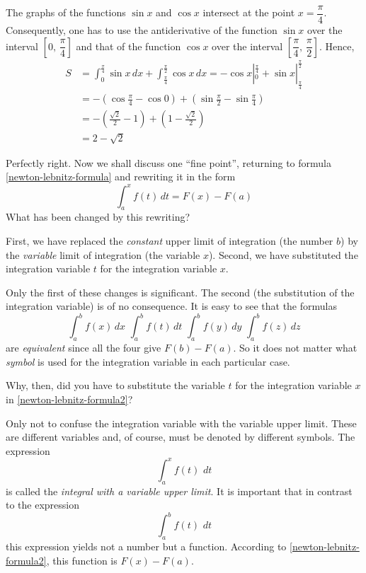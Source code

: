 \rdr The graphs of the functions $\sin x$ and $\cos x$ intersect at the point $x = \dfrac{\pi}{4}$. Consequently, one has to use the antiderivative of the function $\sin x$ over the interval $\left[ 0, \, \dfrac{\pi}{4} \right]$ and that of the function $\cos x$ over the interval $\left[  \dfrac{\pi}{4}, \, \dfrac{\pi}{2} \right]$. Hence,
\begin{align*}%
S & = \int_{0}^{\frac{\pi}{4}} \sin x \, dx + \int_{\frac{\pi}{4}}^{\frac{\pi}{2}} \cos x \, dx  = - \cos x |_{0}^{\frac{\pi}{4}}  + \sin x |_{\frac{\pi}{4}}^{\frac{\pi}{2}} \\
& = - \left(\cos \frac{\pi}{4} - \cos 0 \right) + \left(\sin \frac{\pi}{2} - \sin \frac{\pi}{4}  \right) \\
& = - \left( \frac{\sqrt{2}}{2} - 1 \right) + \left(1 - \frac{\sqrt{2}}{2}  \right) \\
& = 2 - \sqrt{2}
\end{align*}

\athr Perfectly right. Now we shall discuss one ``fine point'', returning to formula \eqref{newton-lebnitz-formula} and rewriting it in the form
\begin{equation}%
\boxed{\int_{a}^{x} f(t) \, dt = F(x)- F(a)}
\label{newton-lebnitz-formula2}
\end{equation}
What has been changed by this rewriting? 

\rdr First, we have replaced the \emph{constant} upper limit of integration (the number $b$) by the \emph{variable} limit of integration (the variable $x$). Second, we have substituted the integration variable $t$ for the integration variable $x$.

\athr Only the first of these changes is significant. The second (the substitution of the integration variable) is of no consequence. It is easy to see that the formulas
\begin{equation*}%
\int_{a}^{b} f(x) \, dx \,\, \int_{a}^{b} f(t) \, dt \,\, \int_{a}^{b} f(y) \, dy \,\, \int_{a}^{b} f(z) \, dz
\end{equation*}
are \emph{equivalent} since all the four give $F (b) - F (a)$. So it does not matter what \emph{symbol} is used for the integration variable in each particular case.

\rdr Why, then, did you have to substitute the variable $t$ for the integration variable $x$ in \eqref{newton-lebnitz-formula2}?

\athr Only not to confuse the integration variable with the variable upper limit. These are different variables and, of course, must be denoted by different symbols.
The expression
\begin{equation*}%
\int_{a}^{x} f(t) \,\, dt
\end{equation*}
is called the \emph{integral with a variable upper limit}. It is important that in contrast to the expression
\begin{equation*}%
\int_{a}^{b} f(t) \,\, dt
\end{equation*}
this expression yields not a number but a function. According to \eqref{newton-lebnitz-formula2}, this function is $F (x) - F (a)$.

